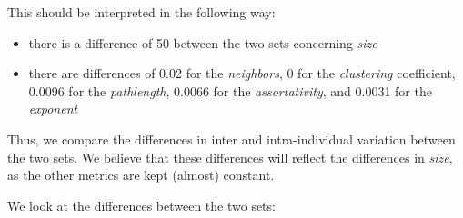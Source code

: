 \documentclass[
]{article}
\providecommand{\tightlist}{%
  \setlength{\itemsep}{0pt}\setlength{\parskip}{0pt}}
\begin{document}
This should be interpreted in the following way:

\begin{itemize}
\tightlist
\item
  there is a difference of 50 between the two sets concerning
  \emph{size}
\item
  there are differences of 0.02 for the \emph{neighbors}, 0 for the
  \emph{clustering} coefficient, 0.0096 for the \emph{pathlength},
  0.0066 for the \emph{assortativity}, and 0.0031 for the
  \emph{exponent}
\end{itemize}

Thus, we compare the differences in inter and intra-individual variation
between the two sets. We believe that these differences will reflect the
differences in \emph{size}, as the other metrics are kept (almost)
constant.

We look at the differences between the two sets:
\end{document}
